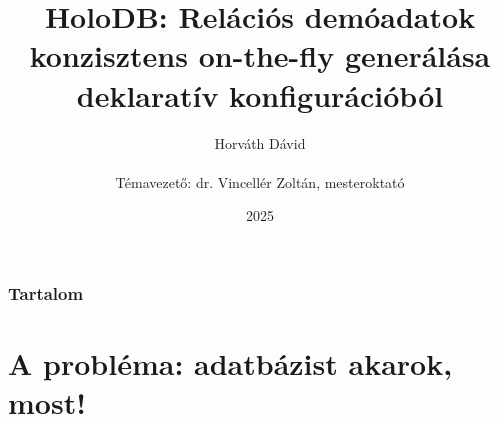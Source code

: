 \documentclass[
    aspectratio=169,
]{beamer}
\title[HoloDB]{HoloDB: Relációs demóadatok konzisztens on-the-fly generálása \\ deklaratív konfigurációból}
\author[Horváth Dávid]{Horváth Dávid \\ ~ \\ { \footnotesize Témavezető: dr. Vincellér Zoltán, mesteroktató }}
\institute[ELTE-IK]{ELTE Informatikai Kar, Információs Rendszerek Tanszék}
\date{2025}
\begin{document}
\beamertemplatenavigationsymbolsempty

\begin{frame}
    \titlepage
\end{frame}

\begin{frame}
    \frametitle{Tartalom}
    \hfill
    \parbox[t]{.95\textwidth}{
        \begin{minipage}[c][0.6\textheight]{\textwidth}
        \tableofcontents
        \end{minipage}
    }
\end{frame}

\section{A probléma: adatbázist akarok, most!}
\def\sectionshorttitle{\arabic{section}. A probléma}
\end{document}
